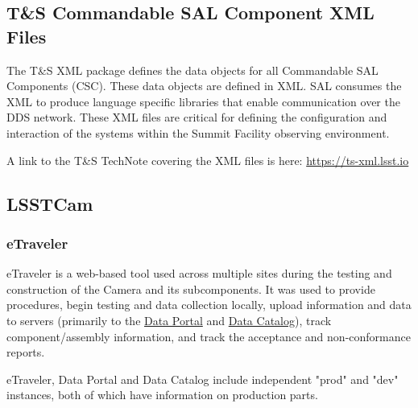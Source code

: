 \subsection{T\&S Commandable SAL Component XML Files}

The T\&S XML package defines the data objects for all Commandable SAL Components (CSC). These data objects are defined in XML. SAL consumes the XML to produce language specific libraries that enable communication over the DDS network.  These XML files are critical for defining the configuration and interaction of the systems within the Summit Facility observing environment.

A link to the T\&S TechNote covering the XML files is here: \url{https://ts-xml.lsst.io}

\subsection{LSSTCam}
	\subsubsection{eTraveler}
	eTraveler is a web-based tool used across multiple sites during the testing and construction of the Camera and its subcomponents. It was used to provide procedures, begin testing and data collection locally, upload information and data to servers (primarily to the \href{http://lsst-camera.slac.stanford.edu/DataPortal/}{Data Portal} and \href{http://srs.slac.stanford.edu/DataCatalog/?experiment=LSST-CAMERA}{Data Catalog}), track component/assembly information, and track the acceptance and non-conformance reports.
	
	eTraveler, Data Portal and Data Catalog include independent "prod" and "dev" instances, both of which have information on production parts.
	
